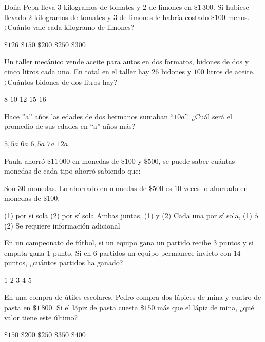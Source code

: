 \documentclass[sin nombre]{srs}
\begin{document}
\begin{preguntas}[after-item-skip=2cm]
\pregunta Doña Pepa lleva $3$ kilogramos de tomates y $2$ de limones en $\$1\,300$. Si hubiese llevado $2$ kilogramos de tomates y $3$ de limones le habría costado $\$100$ menos. ¿Cuánto vale cada kilogramo de limones?
\begin{vertical}
\alternativa $\$126$
\alternativa $\$150$
\alternativa $\$200$
\alternativa $\$250$
\alternativa $\$300$
\end{vertical}

\pregunta Un taller mecánico vende aceite para autos en dos formatos, bidones de dos y cinco litros cada uno. En total en el taller hay $26$ bidones y $100$ litros de aceite. ¿Cuántos bidones de dos litros hay?
\begin{vertical}
\alternativa $8$
\alternativa $10$
\alternativa $12$
\alternativa $15$
\alternativa $16$
\end{vertical}

\pregunta Hace ”a” años las edades de dos hermanos sumaban “$10a$”. ¿Cuál será el promedio de sus edades en “a” años más?
\begin{vertical}
\alternativa $5,5a$
\alternativa $6a$
\alternativa $6,5a$
\alternativa $7a$
\alternativa $12a$
\end{vertical}

\pregunta Paula ahorró $\$11\,000$ en monedas de $\$100$ y $\$500$, se puede saber cuántas monedas de cada tipo ahorró sabiendo que:
\begin{verticaln}
\alternativa Son $30$ monedas.
\alternativa Lo ahorrado en monedas de $\$500$ es $10$ veces lo ahorrado en monedas de $\$100$.
\end{verticaln}
\begin{vertical}
\alternativa (1) por sí sola
\alternativa (2) por sí sola
\alternativa Ambas juntas, (1) y (2)
\alternativa Cada una por sí sola, (1) ó (2)
\alternativa Se requiere información adicional
\end{vertical}

\pregunta En un campeonato de fútbol, si un equipo gana un partido recibe $3$ puntos y si empata gana $1$ punto. Si en $6$ partidos un equipo permanece invicto con $14$ puntos, ¿cuántos partidos ha ganado?
\begin{vertical}
\alternativa $1$
\alternativa $2$
\alternativa $3$
\alternativa $4$
\alternativa $5$
\end{vertical}

\pregunta En una compra de útiles escolares, Pedro compra dos lápices de mina y cuatro de pasta en $\$1\,800$. Si el lápiz de pasta cuesta $\$150$ más que el lápiz de mina, ¿qué valor tiene este último?
\begin{vertical}
\alternativa $\$150$
\alternativa $\$200$
\alternativa $\$250$
\alternativa $\$350$
\alternativa $\$400$
\end{vertical}


\end{preguntas}
\end{document}
